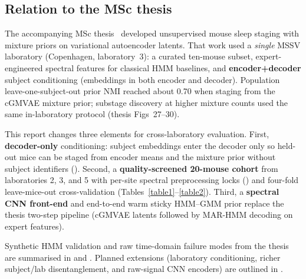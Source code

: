 \subsection{Relation to the MSc thesis}
\label{S7_Appendix_arc}

The accompanying MSc thesis~\cite{elmgreen2026thesis} developed unsupervised mouse sleep staging with mixture priors on variational autoencoder latents.
That work used a \emph{single} MSSV laboratory (Copenhagen, laboratory~3): a curated ten-mouse subset, expert-engineered spectral features for classical HMM baselines, and \textbf{encoder+decoder} subject conditioning (embeddings in both encoder and decoder).
Population leave-one-subject-out prior NMI reached about 0.70 when staging from the cGMVAE mixture prior; substage discovery at higher mixture counts used the same in-laboratory protocol (thesis Figs~27--30).

This report changes three elements for cross-laboratory evaluation.
First, \textbf{decoder-only} conditioning: subject embeddings enter the decoder only so held-out mice can be staged from encoder means and the mixture prior without subject identifiers ().
Second, a \textbf{quality-screened 20-mouse cohort} from laboratories 2, 3, and 5 with per-site spectral preprocessing locks () and four-fold leave-mice-out cross-validation (Tables~\ref{table1}--\ref{table2}).
Third, a \textbf{spectral CNN front-end} and end-to-end warm sticky HMM--GMM prior replace the thesis two-step pipeline (cGMVAE latents followed by MAR-HMM decoding on expert features).

Synthetic HMM validation and raw time-domain failure modes from the thesis are summarised in  and .
Planned extensions (laboratory conditioning, richer subject/lab disentanglement, and raw-signal CNN encoders) are outlined in .
